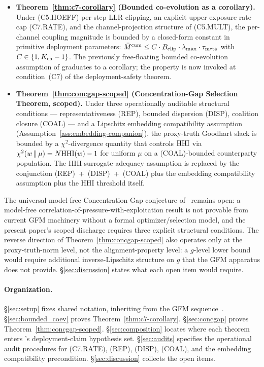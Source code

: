 \begin{itemize}
\item \textbf{Theorem~\ref{thm:c7-corollary} (Bounded co-evolution
  as a corollary).} Under (C5.HOEFF) per-step LLR clipping, an
  explicit upper exposure-rate cap (C7.RATE), and the
  channel-projection structure of (C5.MULT), the per-channel
  coupling magnitude is bounded by a closed-form constant in
  primitive deployment parameters: $\bar{M}^{\mathrm{cum}} \leq C
  \cdot B_{\mathrm{clip}} \cdot \lambda_{\max} \cdot \tau_{\mathrm{meta}}$ with $C \in \{1,
  K_{\mathrm{ch}} - 1\}$. The previously free-floating bounded co-evolution
  assumption of \citep[Deployment Safety]{lasser2026paper10}
  graduates to a corollary; the property is now invoked at
  condition~(C7) of the deployment-safety theorem.

\item \textbf{Theorem~\ref{thm:concgap-scoped} (Concentration-Gap
  Selection Theorem, scoped).} Under three operationally
  auditable structural conditions --- representativeness (REP),
  bounded dispersion (DISP), coalition closure (COAL) --- and a
  Lipschitz embedding compatibility assumption
  (Assumption~\ref{ass:embedding-companion}), the proxy-truth
  Goodhart slack is bounded by a $\chi^2$-divergence quantity that
  controls $\mathrm{HHI}$ via $\chi^2(w \,\|\, \mu) = N \mathrm{HHI}(w) - 1$ for
  uniform $\mu$ on a (COAL)-bounded counterparty population. The
  HHI surrogate-adequacy assumption is replaced by the conjunction
  (REP)~+~(DISP)~+~(COAL) plus the embedding compatibility
  assumption plus the HHI threshold itself.
\end{itemize}

The universal model-free Concentration-Gap conjecture
of~\citep{lasser2026micro} remains open: a model-free
correlation-of-pressure-with-exploitation result is not provable
from current GFM machinery without a formal optimizer/selection
model, and the present paper's scoped discharge requires three
explicit structural conditions. The reverse direction of
Theorem~\ref{thm:concgap-scoped} also operates only at the
proxy-truth-norm level, not the alignment-property level: a
$g$-level lower bound would require additional inverse-Lipschitz
structure on $g$ that the GFM apparatus does not provide.
\S\ref{sec:discussion} states what each open item would require.

\paragraph{Organization.} \S\ref{sec:setup} fixes shared notation,
inheriting from the GFM
sequence~\citep{lasser2026micro,lasser2026paper8a,lasser2026paper8b,lasser2026exo,lasser2026paper10}.
\S\ref{sec:bounded_coev} proves
Theorem~\ref{thm:c7-corollary}. \S\ref{sec:concgap} proves
Theorem~\ref{thm:concgap-scoped}. \S\ref{sec:composition} locates
where each theorem enters
\citep[Deployment Safety]{lasser2026paper10}'s deployment-claim
hypothesis set. \S\ref{sec:audits} specifies the operational
audit procedures for (C7.RATE), (REP), (DISP), (COAL), and the
embedding compatibility precondition.
\S\ref{sec:discussion} collects the open items.
